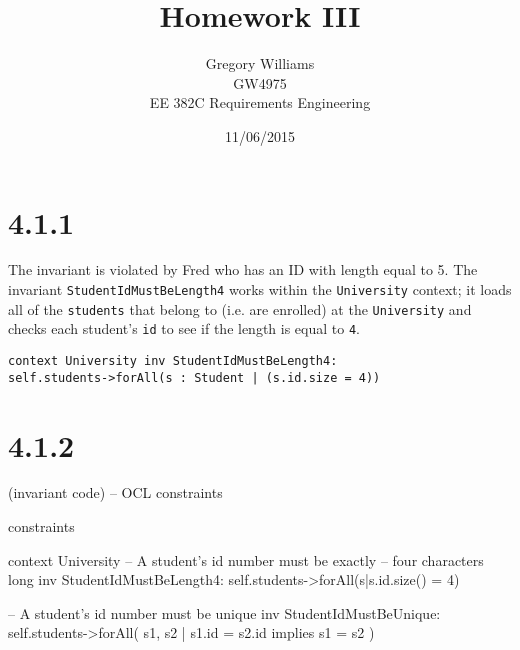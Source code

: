 \documentclass{article}
\title{Homework III}
\author{Gregory Williams\\GW4975\\EE 382C Requirements Engineering}
\date{11/06/2015}
\newcommand{\code}[1]{\colorbox{codegray}{\texttt{#1}}}
\begin{document}
	\maketitle
	
	\section*{4.1.1}
	The invariant is violated by Fred who has an ID with length equal to 5. The invariant \code{StudentIdMustBeLength4} works within the \code{University} context; it loads all of the \code{students} that belong to (i.e. are enrolled) at the \code{University} and checks each student's \code{id} to see if the length is equal to \code{4}.\\
	\begin{center}
	\parbox{0.5\textwidth}{
		\code{context University inv StudentIdMustBeLength4:\\
    	    self.students->forAll(s : Student | (s.id.size = 4))}
	}
	\end{center}
	
	\section*{4.1.2}
	
	(invariant code)
-- OCL constraints

constraints

context University
    -- A student's id number must be exactly
    -- four characters long
    inv StudentIdMustBeLength4:
       self.students->forAll(s|s.id.size() = 4)

	-- A student's id number must be unique
	inv StudentIdMustBeUnique:
		self.students->forAll( s1, s2 | s1.id = s2.id implies s1 = s2 )
	
\end{document}
